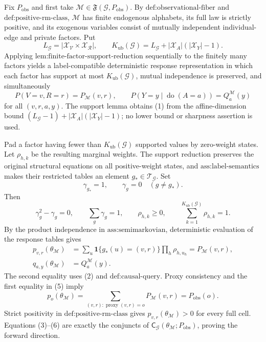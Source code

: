 Fix \(P_{\mathrm{obs}}\) and first take \(\mathcal M\in\mathfrak F(\mathcal G,P_{\mathrm{obs}})\). By \(\text{def:observational-fiber}\) and \(\text{def:positive-rm-class}\), \(\mathcal M\) has finite endogenous alphabets, its full law is strictly positive, and its exogenous variables consist of mutually independent individual-edge and private factors. Put
\[
L_{\mathcal G}=\left|\mathcal X_{\mathcal V}\times\mathcal X_{\mathcal R}\right|,
\qquad
K_{\mathrm{ub}}(\mathcal G)=L_{\mathcal G}+|\mathcal X_A|(|\mathcal X_Y|-1).
\tag{1}
\]
Applying \(\text{lem:finite-factor-support-reduction}\) sequentially to the finitely many factors yields a label-compatible deterministic response representation in which each factor has support at most \(K_{\mathrm{ub}}(\mathcal G)\), mutual independence is preserved, and simultaneously
\[
P(V=v,R=r)=P_{\mathcal M}(v,r),
\qquad
P(Y=y\mid\operatorname{do}(A=a))=Q_a^{\mathcal M}(y)
\tag{2}
\]
for all \((v,r,a,y)\). The support lemma obtains (1) from the affine-dimension bound \((L_{\mathcal G}-1)+|\mathcal X_A|(|\mathcal X_Y|-1)\); no lower bound or sharpness assertion is used.

Pad a factor having fewer than \(K_{\mathrm{ub}}(\mathcal G)\) supported values by zero-weight states. Let \(\rho_{h,k}\) be the resulting marginal weights. The support reduction preserves the original structural equations on all positive-weight states, and \(\text{ass:label-semantics}\) makes their restricted tables an element \(g_*\in\mathcal T_{\mathcal G}\). Set
\[
\gamma_{g_*}=1,
\qquad
\gamma_g=0\quad(g\neq g_*).
\tag{3}
\]
Then
\[
\gamma_g^2-\gamma_g=0,
\qquad
\sum_g\gamma_g=1,
\qquad
\rho_{h,k}\geq0,
\qquad
\sum_{k=1}^{K_{\mathrm{ub}}(\mathcal G)}\rho_{h,k}=1.
\tag{4}
\]
By the product independence in \(\text{ass:semimarkovian}\), deterministic evaluation of the response tables gives
\[
\begin{aligned}
p_{v,r}(\theta_{\mathcal M})
&=\sum_u\mathbf 1\{g_*(u)=(v,r)\}\prod_h\rho_{h,u_h}
=P_{\mathcal M}(v,r),\\
q_{a,y}(\theta_{\mathcal M})
&=Q_a^{\mathcal M}(y).
\end{aligned}
\tag{5}
\]
The second equality uses (2) and \(\text{def:causal-query}\). Proxy consistency and the first equality in (5) imply
\[
p_o(\theta_{\mathcal M})
=\sum_{(v,r):\operatorname{proxy}(v,r)=o}P_{\mathcal M}(v,r)
=P_{\mathrm{obs}}(o).
\tag{6}
\]
Strict positivity in \(\text{def:positive-rm-class}\) gives \(p_{v,r}(\theta_{\mathcal M})>0\) for every full cell. Equations (3)--(6) are exactly the conjuncts of \(\mathsf C_{\mathcal G}(\theta_{\mathcal M};P_{\mathrm{obs}})\), proving the forward direction.

